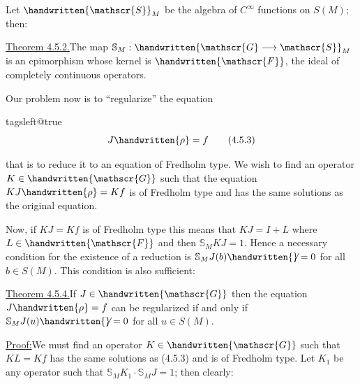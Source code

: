 Let $\handwritten{\mathscr{S}}_M$ be the algebra of $C^\infty$ functions on $S(M)$; then:

\uline{Theorem 4.5.2.}\qquad The map $\mathbb{S}_M:\handwritten{\mathscr{G}\longrightarrow\mathscr{S}}_M$ is an epimorphism whose kernel is $\handwritten{\mathscr{F}}$, the ideal of completely continuous operators.

Our problem now is to ``regularize'' the equation

\begingroup
\csname tagsleft@true\endcsname
\[
J\handwritten{\rho}=f\tag*{(4.5.3)}
\]
\endgroup

that is to reduce it to an equation of Fredholm type. We wish to find an operator $K\in\handwritten{\mathscr{G}}$ such that the equation $KJ\handwritten{\rho}=Kf$ is of Fredholm type and has the same solutions as the original equation.

Now, if $KJ=Kf$ is of Fredholm type this means that $KJ=I+L$ where $L\in\handwritten{\mathscr{F}}$ and then $\mathbb{S}_M KJ=1$. Hence a necessary condition for the existence of a reduction is $\mathbb{S}_M J(b)\handwritten{\not}=0$ for all $b\in S(M)$. This condition is also sufficient:

\uline{Theorem 4.5.4.}\qquad If $J\in\handwritten{\mathscr{G}}$ then the equation $J\handwritten{\rho}=f$ can be regularized if and only if $\mathbb{S}_M J(u)\handwritten{\not}=0$ for all $u\in S(M)$.

\uline{Proof:}\quad We must find an operator $K\in\handwritten{\mathscr{G}}$ such that $KL=Kf$ has the same solutions as (4.5.3) and is of Fredholm type. Let $K_1$ be any operator such that $\mathbb{S}_M K_1\cdot\mathbb{S}_M J=1$; then clearly:
